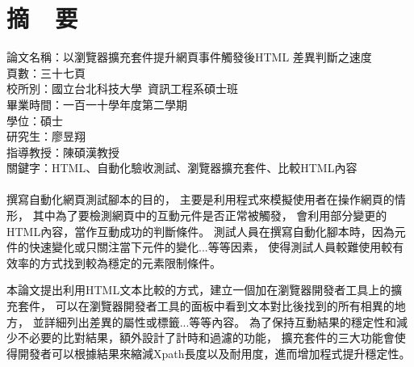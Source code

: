 \chapter*{摘~~要}


\noindent
論文名稱：以瀏覽器擴充套件提升網頁事件觸發後HTML 差異判斷之速度\\
頁數：三十七頁\\
校所別：國立台北科技大學~資訊工程系碩士班\\
畢業時間：一百一十學年度第二學期\\
學位：碩士\\
研究生：廖昱翔\\
指導教授：陳碩漢教授\\
\noindent
關鍵字：HTML、自動化驗收測試、瀏覽器擴充套件、比較HTML內容\\
\hspace*{\fill}\\
%
\indent
撰寫自動化網頁測試腳本的目的，
主要是利用程式來模擬使用者在操作網頁的情形，
其中為了要檢測網頁中的互動元件是否正常被觸發，
會利用部分變更的HTML內容，當作互動成功的判斷條件。
測試人員在撰寫自動化腳本時，因為元件的快速變化或只關注當下元件的變化...等等因素，
使得測試人員較難使用較有效率的方式找到較為穩定的元素限制條件。

本論文提出利用HTML文本比較的方式，建立一個加在瀏覽器開發者工具上的擴充套件，
可以在瀏覽器開發者工具的面板中看到文本對比後找到的所有相異的地方，
並詳細列出差異的屬性或標籤...等等內容。
為了保持互動結果的穩定性和減少不必要的比對結果，額外設計了計時和過濾的功能，
擴充套件的三大功能會使得開發者可以根據結果來縮減Xpath長度以及耐用度，進而增加程式提升穩定性。